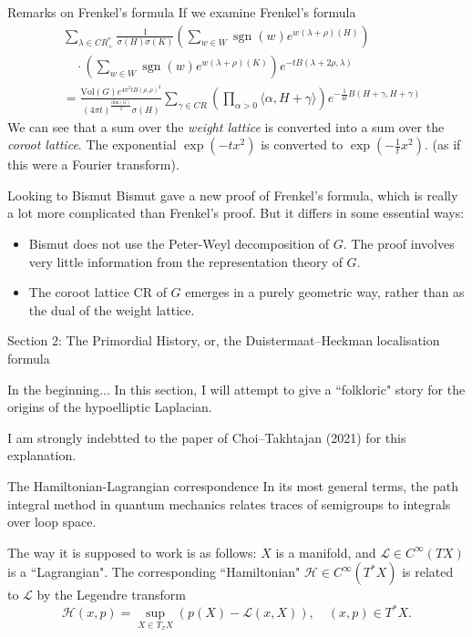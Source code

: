 \documentclass{beamer}
\numberwithin{equation}{section}
\theoremstyle{plain}
\theoremstyle{plain}
\theoremstyle{definition}
\theoremstyle{plain}
\theoremstyle{plain}
\theoremstyle{definition}
\newcommand{\Hc}{\mathcal{H}}
\newcommand{\Lc}{\mathcal{L}}
\newcommand{\sgn}{\operatorname{sgn}}
\newcommand{\CR}{\mathrm{CR}}
\begin{document}
\begin{frame}{Remarks on Frenkel's formula}
If we examine Frenkel's formula
\begin{align*}
 &\sum_{\lambda \in CR^*_+} \frac{1}{\sigma(H)\sigma(K)}\left(\sum_{w \in W} \sgn(w)e^{w(\lambda+\rho)(H)}\right)\\
      &\quad \cdot \left(\sum_{w\in W} \sgn(w)e^{w(\lambda+\rho)(K)}\right)e^{-tB(\lambda+2\rho,\lambda)}\\
      &=\frac{\mathrm{Vol}(G)e^{4\pi^2tB(\rho,\rho)^2}}{(4\pi t)^{\frac{\mathrm{dim}(G)}{2}}\sigma(H)}\sum_{\gamma \in CR} \left(\prod_{\alpha>0} \langle \alpha,H+\gamma\rangle\right) e^{-\frac{1}{4t}B(H+\gamma,H+\gamma)}
\end{align*}
We can see that a sum over the \emph{weight lattice} is converted into a sum over the \emph{coroot lattice}. The exponential $\exp(-tx^2)$ is converted to $\exp(-\frac{1}{t}x^2).$ (as if this were a Fourier transform).
\end{frame}

\begin{frame}{Looking to Bismut}
Bismut gave a new proof of Frenkel's formula, which is really a lot more complicated than Frenkel's proof. But it differs in some essential ways:
\begin{itemize}
  \item{} Bismut does not use the Peter-Weyl decomposition of $G.$ The proof involves very little information from the representation theory of $G.$
  \item{} The coroot lattice $\CR$ of $G$ emerges in a purely geometric way, rather than as the dual of the weight lattice.
\end{itemize}
\end{frame}

\begin{frame}
    \huge{Section 2: The Primordial History, or, the Duistermaat--Heckman localisation formula}
\end{frame}

\begin{frame}{In the beginning...}
  In this section, I will attempt to give a ``folkloric" story for the origins of the hypoelliptic Laplacian.
  
  I am strongly indebtted to the paper of Choi--Takhtajan (2021) for this explanation.
\end{frame}

\begin{frame}{The Hamiltonian-Lagrangian correspondence}
  In its most general terms, the path integral method in quantum mechanics relates traces of semigroups
  to integrals over loop space. 
  
  The way it is supposed to work is as follows: $X$ is a manifold, and $\Lc \in C^\infty(TX)$ is a ``Lagrangian". The corresponding
  ``Hamiltonian" $\Hc\in C^\infty(T^*X)$ is related to $\Lc$ by the Legendre transform 
  \[
    \Hc(x,p) = \sup_{X \in T_xX} (p(X)-\Lc(x,X)),\quad (x,p) \in T^*X.
  \]
\end{frame}
\end{document}
